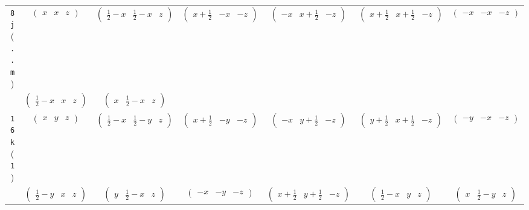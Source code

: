 \documentclass[fleqn,9pt,landscape]{jsarticle}
\begin{document}
\begin{center}
\begin{longtable}{ccccccc}
{\tt 8j} ({\tt ..m}) & $ \begin{pmatrix} x & x & z \end{pmatrix} $ & $ \begin{pmatrix} \frac{1}{2} - x & \frac{1}{2} - x & z \end{pmatrix} $ & $ \begin{pmatrix} x + \frac{1}{2} & - x & - z \end{pmatrix} $ & $ \begin{pmatrix} - x & x + \frac{1}{2} & - z \end{pmatrix} $ & $ \begin{pmatrix} x + \frac{1}{2} & x + \frac{1}{2} & - z \end{pmatrix} $ & $ \begin{pmatrix} - x & - x & - z \end{pmatrix} $ \\
& $ \begin{pmatrix} \frac{1}{2} - x & x & z \end{pmatrix} $ & $ \begin{pmatrix} x & \frac{1}{2} - x & z \end{pmatrix} $ & $  $ & $  $ & $  $ & $  $ \\ \hline
{\tt 16k} ({\tt 1}) & $ \begin{pmatrix} x & y & z \end{pmatrix} $ & $ \begin{pmatrix} \frac{1}{2} - x & \frac{1}{2} - y & z \end{pmatrix} $ & $ \begin{pmatrix} x + \frac{1}{2} & - y & - z \end{pmatrix} $ & $ \begin{pmatrix} - x & y + \frac{1}{2} & - z \end{pmatrix} $ & $ \begin{pmatrix} y + \frac{1}{2} & x + \frac{1}{2} & - z \end{pmatrix} $ & $ \begin{pmatrix} - y & - x & - z \end{pmatrix} $ \\
& $ \begin{pmatrix} \frac{1}{2} - y & x & z \end{pmatrix} $ & $ \begin{pmatrix} y & \frac{1}{2} - x & z \end{pmatrix} $ & $ \begin{pmatrix} - x & - y & - z \end{pmatrix} $ & $ \begin{pmatrix} x + \frac{1}{2} & y + \frac{1}{2} & - z \end{pmatrix} $ & $ \begin{pmatrix} \frac{1}{2} - x & y & z \end{pmatrix} $ & $ \begin{pmatrix} x & \frac{1}{2} - y & z \end{pmatrix} $ \\

\end{longtable}
\end{center}
\end{document}
